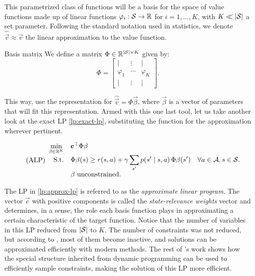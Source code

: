 This parametrized class of functions will be a basis for the space of value
functions made up of linear functions $\varphi_i : \mathcal{S} \to \mathbb{R}$ for $i = 1,
\dots, K$, with $K \ll |\mathcal{S}|$ a set parameter. Following the standard
notation used in statistics, we denote $\widehat{\vec{v}} \approx \vec{v}$ the
linear approximation to the value function.

\begin{dfn}{Basis matrix}{}
    We define a matrix $\Phi \in \mathbb{R}^{|\mathcal{S}| \times K}$ given by:
    \[
        \Phi =
        \begin{bmatrix}
            | & \vdots & | \\
            \varphi_1 & \cdots & \varphi_K \\
            | & \vdots & |
        \end{bmatrix}.
    \]
\end{dfn}

This way, use the representation for $\widehat{\vec{v}} = \Phi \vec{\beta}$,
where $\vec{\beta}$ is a vector of parameters that will fit this representation.
Armed with this one last tool, let us take another look at the exact LP
\eqref{lp:exact-lp}, substituting the function for the approximation wherever
pertinent.

\begin{equation}
\label{lp:approx-lp}
\tag{ALP}
\begin{array}{rl@{}ll}
    \displaystyle \min_{\vec{\beta} \in \R^{K}} & \vec{c}^{\top} \Phi \vec{\beta} \\
    \text{S.t.} & \displaystyle \Phi \vec{\beta}(s) \geq r(s,a) + \gamma \sum_{s'} p(s' \mid s, a) \, \Phi \vec{\beta} (s') & \quad \forall a \in \Actions, s \in \States. \\
    & \vec{\beta} \text{ unconstrained}.
\end{array}
\end{equation}

The LP in \eqref{lp:approx-lp} is referred to as the \textit{approximate linear
program}. The vector $\vec{c}$ with positive components is called the
\emph{state-relevance weights} vector and determines, in a sense, the role each
basis function plays in approximating a certain characteristic of the target
function. Notice that the number of variables in this LP reduced from
$|\mathcal{S}|$ to $K$. The number of constraints was not reduced, but according to
\cite{farias2002thesis}, most of them become inactive, and solutions can be
approximated efficiently with modern methods. The rest of
\citeauthor{farias2002thesis}'s work shows how the special structure inherited
from dynamic programming can be used to efficiently sample constraints, making
the solution of this LP more efficient.

